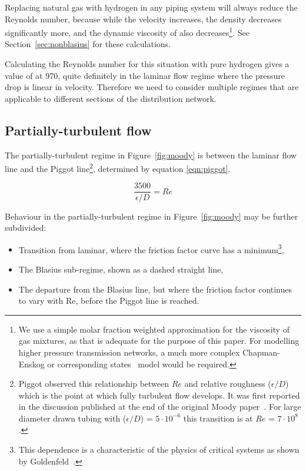 \documentclass[5p]{elsarticle} %
\begin{document}
Replacing natural gas with hydrogen in any piping system will always reduce the Reynolds number, because while the velocity increases, the density decreases significantly more, and the dynamic viscosity of also decreases\footnote{We use a simple molar fraction weighted approximation for the viscosity of gas mixtures, as that is adequate for the purpose of this paper. For modelling higher pressure transmission networks, a much more complex Chapman-Enskog or corresponding states~\citep{coolprop} model would be required.}.
See Section~\ref{sec:nonblasius} for these calculations.

Calculating the Reynolds number for this situation with pure hydrogen gives a value of at 970, quite definitely in the laminar flow regime where the pressure drop is linear in velocity.
Therefore we need to consider multiple regimes that are applicable to different sections of the distribution network.

\subsection{Partially-turbulent flow}

The partially-turbulent regime in Figure~\ref{fig:moody} is between the laminar flow line and the 
Piggot line\footnote{Piggot observed this relationship between $Re$ and relative roughness ($\epsilon/D$) which is the point at which fully turbulent flow develops. 
It was first reported in the discussion published at the end of the original Moody paper~\citep{Moody1944}. 
For large diameter drawn tubing with ($\epsilon/D$) = $5\cdot10^{-6}$ this transition is at $Re$ = $7\cdot10^8$.
}, determined by equation \ref{eqn:piggot}. 

\begin{equation}
\label{eqn:piggot}
   \frac{3500}{\epsilon/D} = Re
\end{equation}

Behaviour in the partially-turbulent regime in Figure~\ref{fig:moody} may be further subdivided:
\begin{itemize}
    \item Transition from laminar, where the friction factor curve has a minimum\footnote{This dependence is a characteristic of the physics of critical systems as shown by Goldenfeld~\citep{Goldenfeld2006}.},
    \item The Blasius sub-regime, shown  as a dashed straight line,
    \item The departure from the Blasius line, but where the friction factor continues to vary with Re, before the Piggot line is reached.
\end{itemize}
\end{document}
